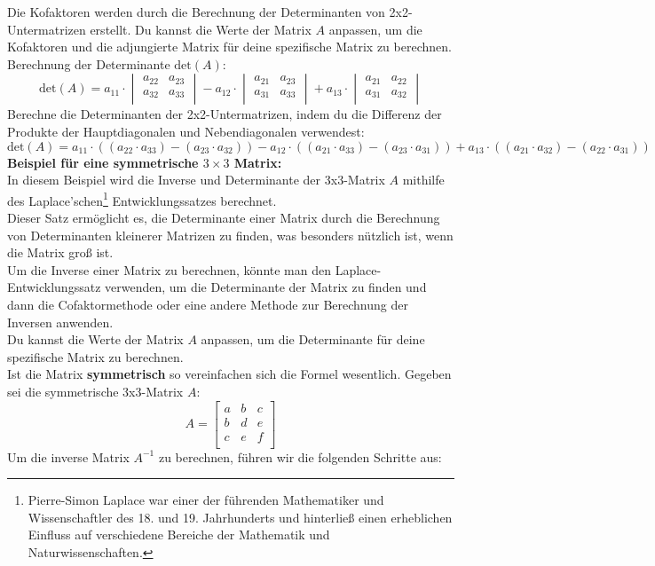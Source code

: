 \documentclass[12pt]{article}
\begin{document}
Die Kofaktoren werden durch die Berechnung der Determinanten von 2x2-Untermatrizen erstellt. Du kannst die Werte der Matrix $A$ anpassen, um die Kofaktoren und die adjungierte Matrix für deine spezifische Matrix zu berechnen.\\[0.4cm]
Berechnung der Determinante $\text{det}(A)$:
\[
\text{det}(A) = a_{11} \cdot \begin{vmatrix}
    a_{22} & a_{23} \\
    a_{32} & a_{33} \\
\end{vmatrix} - a_{12} \cdot \begin{vmatrix}
    a_{21} & a_{23} \\
    a_{31} & a_{33} \\
\end{vmatrix} + a_{13} \cdot \begin{vmatrix}
    a_{21} & a_{22} \\
    a_{31} & a_{32} \\
\end{vmatrix}
\]
Berechne die Determinanten der 2x2-Untermatrizen, indem du die Differenz der Produkte der Hauptdiagonalen und Nebendiagonalen verwendest:
\[
\text{det}(A) = a_{11} \cdot ((a_{22} \cdot a_{33}) - (a_{23} \cdot a_{32})) - a_{12} \cdot ((a_{21} \cdot a_{33}) - (a_{23} \cdot a_{31})) + a_{13} \cdot ((a_{21} \cdot a_{32}) - (a_{22} \cdot a_{31}))
\]
%
\textbf{Beispiel für eine symmetrische $3 \times 3$ Matrix:}\\[0.2cm]
In diesem Beispiel wird die Inverse und Determinante der 3x3-Matrix $A$ mithilfe des Laplace'schen\footnote{Pierre-Simon Laplace war einer der führenden Mathematiker und Wissenschaftler des 18. und 19. Jahrhunderts und hinterließ einen erheblichen Einfluss auf verschiedene Bereiche der Mathematik und Naturwissenschaften.} Entwicklungssatzes berechnet.\\
Dieser Satz ermöglicht es, die Determinante einer Matrix durch die Berechnung von Determinanten kleinerer Matrizen zu finden, was besonders nützlich ist, wenn die Matrix groß ist. \\
Um die Inverse einer Matrix zu berechnen, könnte man den Laplace-Entwicklungssatz verwenden, um die Determinante der Matrix zu finden und dann die Cofaktormethode oder eine andere Methode zur Berechnung der Inversen anwenden. \\
Du kannst die Werte der Matrix $A$ anpassen, um die Determinante für deine spezifische Matrix zu berechnen.\\[0.2cm]
Ist die Matrix \textbf{symmetrisch} so vereinfachen sich die Formel wesentlich. Gegeben sei die symmetrische 3x3-Matrix $A$:
\[
A = \begin{bmatrix}
    a & b & c \\
    b & d & e \\
    c & e & f \\
\end{bmatrix}
\]
Um die inverse Matrix $A^{-1}$ zu berechnen, führen wir die folgenden Schritte aus:\\[0.2cm]
\end{document}
